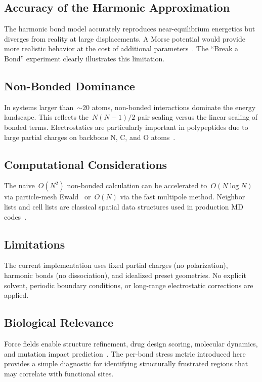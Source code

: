 \documentclass[conference]{IEEEtran}
\begin{document}
\subsection{Accuracy of the Harmonic Approximation}

The harmonic bond model accurately reproduces near-equilibrium energetics but
diverges from reality at large displacements.  A Morse potential would provide
more realistic behavior at the cost of additional parameters~\cite{leach2001}.
The ``Break a Bond'' experiment clearly illustrates this limitation.

\subsection{Non-Bonded Dominance}

In systems larger than~$\sim 20$ atoms, non-bonded interactions dominate the
energy landscape.  This reflects the~$N(N-1)/2$ pair scaling versus the
linear scaling of bonded terms.  Electrostatics are particularly important in
polypeptides due to large partial charges on backbone N, C, and O
atoms~\cite{mackerell1998}.

\subsection{Computational Considerations}

The naive~$O(N^2)$ non-bonded calculation can be accelerated to~$O(N \log N)$
via particle-mesh Ewald~\cite{darden1993} or~$O(N)$ via the fast multipole
method.  Neighbor lists and cell lists are classical spatial data structures
used in production MD codes~\cite{allen2017}.

\subsection{Limitations}

The current implementation uses fixed partial charges (no polarization),
harmonic bonds (no dissociation), and idealized preset geometries.  No explicit
solvent, periodic boundary conditions, or long-range electrostatic corrections
are applied.

\subsection{Biological Relevance}

Force fields enable structure refinement, drug design scoring, molecular
dynamics, and mutation impact prediction~\cite{karplus2002}.  The per-bond
stress metric introduced here provides a simple diagnostic for identifying
structurally frustrated regions that may correlate with functional sites.
\end{document}
